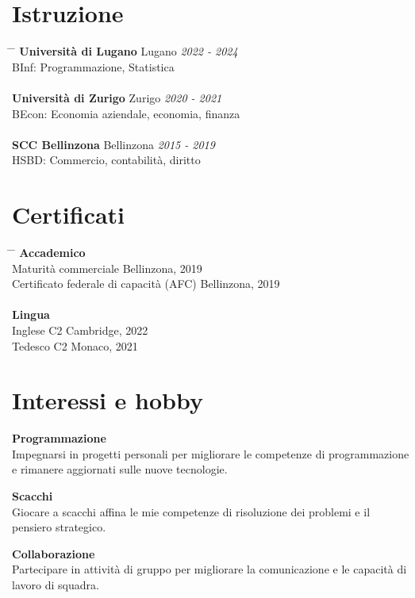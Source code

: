\documentclass[a4paper,11pt]{article}  %
\begin{document}
\section*{Istruzione}
\begin{tabbing}
\hspace{3.5in} \= \hspace{2in} \= \kill
\textbf{Università di Lugano} \> Lugano \> \textit{2022 - 2024} \\
BInf: Programmazione, Statistica \> \\
\\
\textbf{Università di Zurigo} \> Zurigo \> \textit{2020 - 2021} \\
BEcon: Economia aziendale, economia, finanza \> \\
\\
\textbf{SCC Bellinzona} \> Bellinzona \> \textit{2015 - 2019} \\
HSBD: Commercio, contabilità, diritto \> \\
\end{tabbing}


\section*{Certificati}
\begin{tabbing}
\hspace{3.5in} \= \hspace{2in} \= \kill
\textbf{Accademico} \\
Maturità commerciale \> Bellinzona, 2019 \\
Certificato federale di capacità (AFC) \> Bellinzona, 2019 \\
\\
\textbf{Lingua} \\
Inglese C2 \> Cambridge, 2022 \\
Tedesco C2 \> Monaco, 2021 \\
\end{tabbing}

\newpage

\section*{Interessi e hobby}
\begin{multicols}{3}
\justifying
\textbf{Programmazione} \\
Impegnarsi in progetti personali
per migliorare le competenze di programmazione e
rimanere aggiornati sulle nuove tecnologie.

\columnbreak

\justifying
\textbf{Scacchi} \\
Giocare a scacchi affina le mie
competenze di risoluzione dei problemi e
il pensiero strategico.

\columnbreak

\justifying
\textbf{Collaborazione} \\
Partecipare in attività di gruppo
per migliorare la comunicazione
e le capacità di lavoro di squadra.
\end{multicols}
\end{document}
